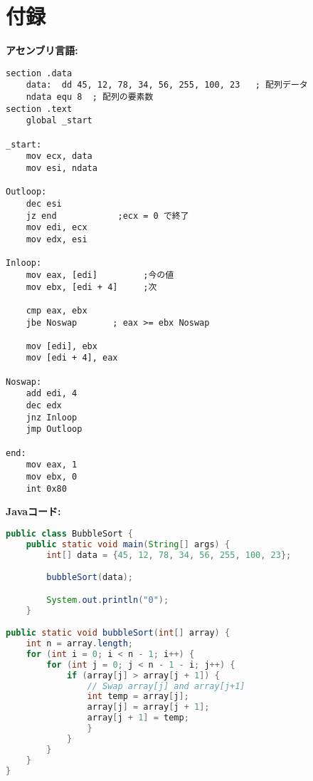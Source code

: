 \documentclass{jlreq}
\begin{document}
\section*{付録}
\begin{multicols}{2}
    \noindent
    \textbf{アセンブリ言語:}\\
    \begin{lstlisting}[language=x86]
    section .data
    data:  dd 45, 12, 78, 34, 56, 255, 100, 23   ; 配列データ
    ndata equ 8  ; 配列の要素数
section .text
    global _start

_start:
    mov ecx, data        
    mov esi, ndata
    
Outloop:
    dec esi
    jz end            ;ecx = 0 で終了
    mov edi, ecx
    mov edx, esi

Inloop:
    mov eax, [edi]         ;今の値
    mov ebx, [edi + 4]     ;次

    cmp eax, ebx
    jbe Noswap       ; eax >= ebx Noswap

    mov [edi], ebx
    mov [edi + 4], eax

Noswap:
    add edi, 4
    dec edx
    jnz Inloop
    jmp Outloop

end:
    mov eax, 1
    mov ebx, 0
    int 0x80
    \end{lstlisting}

    \columnbreak

    \textbf{Javaコード:}\\
    \begin{lstlisting}[language=Java]
public class BubbleSort {
    public static void main(String[] args) {
        int[] data = {45, 12, 78, 34, 56, 255, 100, 23};

        bubbleSort(data);

        System.out.println("0");
    }

public static void bubbleSort(int[] array) {
    int n = array.length;
    for (int i = 0; i < n - 1; i++) {
        for (int j = 0; j < n - 1 - i; j++) {
            if (array[j] > array[j + 1]) {
                // Swap array[j] and array[j+1]
                int temp = array[j];
                array[j] = array[j + 1];
                array[j + 1] = temp;
                }
            }
        }
    }
}
    \end{lstlisting}
\end{multicols}
\end{document}
